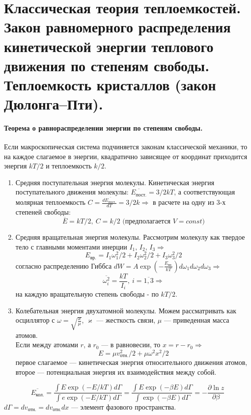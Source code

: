 \section{\normalsize Классическая теория теплоемкостей. Закон равномерного распределения кинетической энергии теплового движения по степеням свободы. Теплоемкость кристаллов (закон Дюлонга--Пти).}
\paragraph{Теорема о равнораспределении энергии по степеням свободы.} Если макроскопическая система подчиняется законам классической механики, то на каждое слагаемое в энергии, квадратично зависящее от координат приходится энергия $kT/2$ и теплоемкость $k/2$.
\begin{enumerate}
\item Средняя поступательная энергия молекулы. 
Кинетическая энергия поступательного движения молекулы: $\overline{E_\text{пост.}}=3/2kT$, а соответствующая молярная теплоемкость $C=\frac{d\overline{E_\text{пост.}}}{dT}=3/2k\Rightarrow$ в расчете на одну из 3-х степеней свободы:
\[
\overline{E}=kT/2,\ C=k/2\text{ (предполагается } V = const)
\]
\item Средняя вращательная энергия молекулы. Рассмотрим молекулу как твердое тело с главными моментами инерции $I_1,\,I_2,\,I_3\Rightarrow$
\[
 E_\text{вр.}=I_1\omega_1^2/2+I_2\omega_2^2/2+I_3\omega_3^2/2
\]
согласно распределению Гиббса $dW=A\exp(-\frac{E_\text{вр.}}{kT})d\omega_1d\omega_2d\omega_3\Rightarrow$
\[
\overline{\omega_i^2}=\frac{kT}{I_i},\ i=\overline{1,3}\Rightarrow
\]
на каждую вращательную степень свободы - по $kT/2$.
\item Колебательная энергия двухатомной молекулы. Можем рассматривать как осциллятор с $\omega=\sqrt{\frac{\varkappa}{\mu}}$, $\varkappa$ --- жесткость связи, $\mu$ --- приведенная масса атомов.\\
Если между атомами $r$, а $r_0$ --- в равновесии, то $x=r-r_0\Rightarrow$
\[
E=\mu v_\text{отн.}^2/2+\mu\omega^2x^2/2
\]
первое слагаемое --- кинетическая энергия относительного движения атомов,\\
второе --- потенциальная энергия их взаимодействия между собой.
\end{enumerate}
\[
\overline{E_\text{кол.}}=\frac{\int E\exp(-E/kT)d\Gamma}{\int e\exp(-E/kT)d\Gamma}=\frac{\int E\exp(-\beta E)d\Gamma}{\int \exp(-\beta E)d\Gamma}=-\frac{\partial \ln z}{\partial \beta}
\]
$ d\Gamma=dv_\text{отн.}=dv_\text{отн.} dx$ --- элемент фазового пространства.
